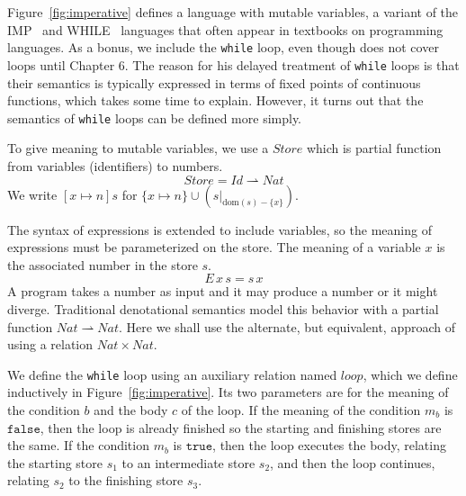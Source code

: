 \documentclass{tufte-handout}
\newcommand{\TRUE}[0]{\mathtt{true}}
\newcommand{\FALSE}[0]{\mathtt{false}}
\begin{document}

Figure~\ref{fig:imperative} defines a language with mutable variables,
a variant of the
IMP~\citep{Plotkin:1983aa,Winskel:1993uq,Amadio:1998fk} and
WHILE~\citep{Hoare:1969kw} languages that often appear in textbooks on
programming languages. As a bonus, we include the \texttt{while} loop,
even though \citet{Schmidt:1986vn} does not cover loops until Chapter
6. The reason for his delayed treatment of \texttt{while} loops is
that their semantics is typically expressed in terms of fixed points
of continuous functions, which takes some time to explain. However, it
turns out that the semantics of \texttt{while} loops can be defined
more simply.

To give meaning to mutable variables, we use a $\mathit{Store}$ which
is partial function from variables (identifiers) to numbers.
\[
  \mathit{Store} = \mathit{Id} \rightharpoonup \mathit{Nat}
\]
We write $[x\mapsto n]s$ for $\{x\mapsto n\} \cup
(s|_{\mathrm{dom}(s)-\{x\}})$.

The syntax of expressions is extended to include variables, so the
meaning of expressions must be parameterized on the store. The meaning
of a variable $x$ is the associated number in the store $s$.
\[
  E\,x\,s = s\,x
\]
%
A program takes a number as input and it may produce a number or it
might diverge. Traditional denotational semantics model this behavior
with a partial function
$\mathit{Nat}\rightharpoonup\mathit{Nat}$. Here we shall use the
alternate, but equivalent, approach of using a relation
$\mathit{Nat}\times\mathit{Nat}$.

We define the \texttt{while} loop using an auxiliary relation named
$\mathit{loop}$, which we define inductively in
Figure~\ref{fig:imperative}. Its two parameters are for the meaning of
the condition $b$ and the body $c$ of the loop.  If the meaning of the
condition $m_b$ is $\FALSE$, then the loop is already finished so the
starting and finishing stores are the same. If the condition $m_b$ is
$\TRUE$, then the loop executes the body, relating the starting store
$s_1$ to an intermediate store $s_2$, and then the loop continues,
relating $s_2$ to the finishing store $s_3$.

\end{document}

